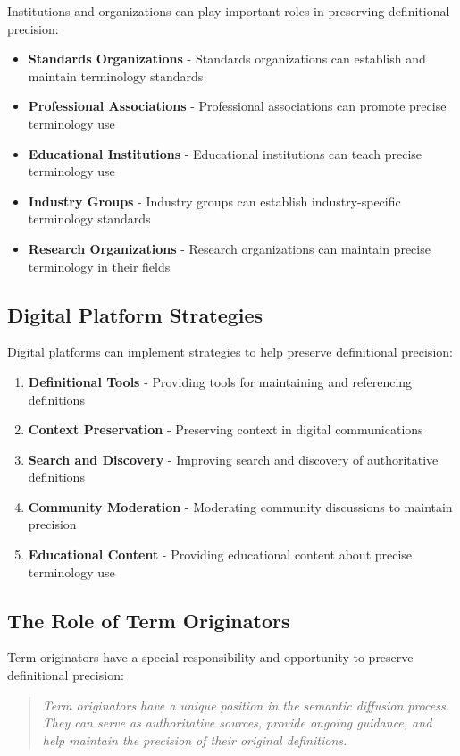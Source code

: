 \documentclass[11pt]{article}
\begin{document}
Institutions and organizations can play important roles in preserving definitional precision:

\begin{itemize}
\item \textbf{Standards Organizations} - Standards organizations can establish and maintain terminology standards
\item \textbf{Professional Associations} - Professional associations can promote precise terminology use
\item \textbf{Educational Institutions} - Educational institutions can teach precise terminology use
\item \textbf{Industry Groups} - Industry groups can establish industry-specific terminology standards
\item \textbf{Research Organizations} - Research organizations can maintain precise terminology in their fields
\end{itemize}

\subsection{Digital Platform Strategies}

Digital platforms can implement strategies to help preserve definitional precision:

\begin{enumerate}
\item \textbf{Definitional Tools} - Providing tools for maintaining and referencing definitions
\item \textbf{Context Preservation} - Preserving context in digital communications
\item \textbf{Search and Discovery} - Improving search and discovery of authoritative definitions
\item \textbf{Community Moderation} - Moderating community discussions to maintain precision
\item \textbf{Educational Content} - Providing educational content about precise terminology use
\end{enumerate}

\subsection{The Role of Term Originators}

Term originators have a special responsibility and opportunity to preserve definitional precision:

\begin{quote}
\emph{Term originators have a unique position in the semantic diffusion process. They can serve as authoritative sources, provide ongoing guidance, and help maintain the precision of their original definitions.}
\end{quote}
\end{document}
